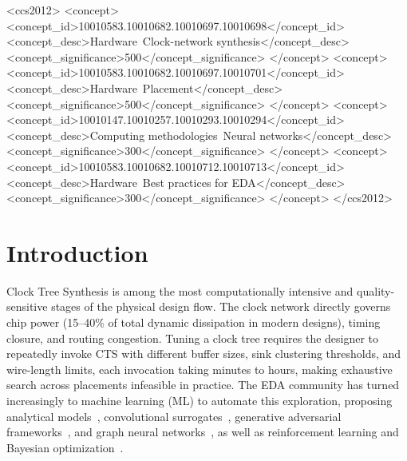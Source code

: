 \documentclass[acmsmall,review,anonymous]{acmart}
\begin{document}
\begin{CCSXML}
<ccs2012>
  <concept>
    <concept_id>10010583.10010682.10010697.10010698</concept_id>
    <concept_desc>Hardware~Clock-network synthesis</concept_desc>
    <concept_significance>500</concept_significance>
  </concept>
  <concept>
    <concept_id>10010583.10010682.10010697.10010701</concept_id>
    <concept_desc>Hardware~Placement</concept_desc>
    <concept_significance>500</concept_significance>
  </concept>
  <concept>
    <concept_id>10010147.10010257.10010293.10010294</concept_id>
    <concept_desc>Computing methodologies~Neural networks</concept_desc>
    <concept_significance>300</concept_significance>
  </concept>
  <concept>
    <concept_id>10010583.10010682.10010712.10010713</concept_id>
    <concept_desc>Hardware~Best practices for EDA</concept_desc>
    <concept_significance>300</concept_significance>
  </concept>
</ccs2012>
\end{CCSXML}



\maketitle

\section{Introduction}
\label{sec:intro}

Clock Tree Synthesis is among the most computationally intensive and
quality-sensitive stages of the physical design flow. The clock network
directly governs chip power (15--40\% of total dynamic dissipation in
modern designs), timing closure, and routing congestion. Tuning a clock
tree requires the designer to repeatedly invoke CTS with different
buffer sizes, sink clustering thresholds, and wire-length limits, each
invocation taking minutes to hours, making exhaustive search across
placements infeasible in practice. The EDA community has turned increasingly to
machine learning (ML) to automate this exploration, proposing analytical
models~\cite{kahng,kahng2,kahng3}, convolutional
surrogates~\cite{nagaria2020}, generative adversarial
frameworks~\cite{gan-cts}, and graph neural
networks~\cite{wu2025graph,Hu2023SyncTREE}, as well as reinforcement
learning and Bayesian optimization~\cite{agnesina,thomas2025,geng2022,zheng2023}.
\end{document}
